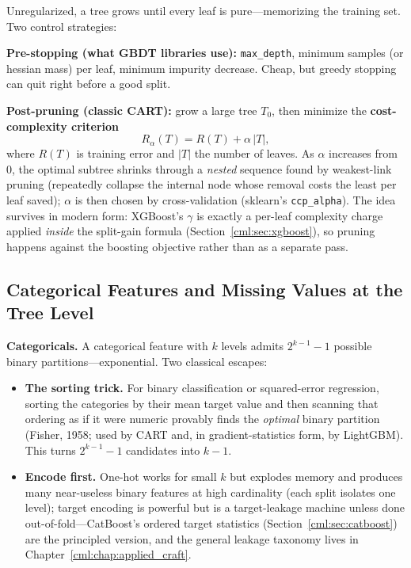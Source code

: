 Unregularized, a tree grows until every leaf is pure---memorizing the training set. Two control strategies:

\textbf{Pre-stopping (what GBDT libraries use):} \texttt{max\_depth}, minimum samples (or hessian mass) per leaf, minimum impurity decrease. Cheap, but greedy stopping can quit right before a good split.

\textbf{Post-pruning (classic CART):} grow a large tree $T_0$, then minimize the \textbf{cost-complexity criterion}
\begin{equation}
R_\alpha(T) = R(T) + \alpha \, |T|,
\end{equation}
where $R(T)$ is training error and $|T|$ the number of leaves. As $\alpha$ increases from $0$, the optimal subtree shrinks through a \textit{nested} sequence found by weakest-link pruning (repeatedly collapse the internal node whose removal costs the least per leaf saved); $\alpha$ is then chosen by cross-validation (sklearn's \texttt{ccp\_alpha}). The idea survives in modern form: XGBoost's $\gamma$ is exactly a per-leaf complexity charge applied \textit{inside} the split-gain formula (Section~\ref{cml:sec:xgboost}), so pruning happens against the boosting objective rather than as a separate pass.

\subsection{Categorical Features and Missing Values at the Tree Level}

\textbf{Categoricals.} A categorical feature with $k$ levels admits $2^{k-1}-1$ possible binary partitions---exponential. Two classical escapes:
\begin{itemize}
    \item \textbf{The sorting trick.} For binary classification or squared-error regression, sorting the categories by their mean target value and then scanning that ordering as if it were numeric provably finds the \textit{optimal} binary partition (Fisher, 1958; used by CART and, in gradient-statistics form, by LightGBM). This turns $2^{k-1}-1$ candidates into $k-1$.
    \item \textbf{Encode first.} One-hot works for small $k$ but explodes memory and produces many near-useless binary features at high cardinality (each split isolates one level); target encoding is powerful but is a target-leakage machine unless done out-of-fold---CatBoost's ordered target statistics (Section~\ref{cml:sec:catboost}) are the principled version, and the general leakage taxonomy lives in Chapter~\ref{cml:chap:applied_craft}.
\end{itemize}

